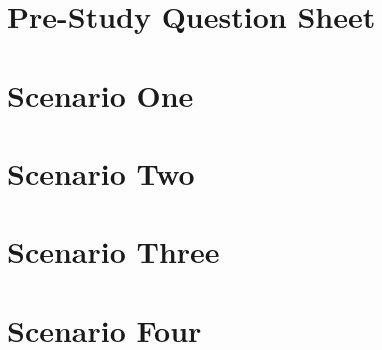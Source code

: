  \clearpage

\section{Pre-Study Question Sheet}

 \clearpage

\section{Scenario One}

 \clearpage

\section{Scenario Two}

 \clearpage

\section{Scenario Three}

 \clearpage

\section{Scenario Four}

 \clearpage
